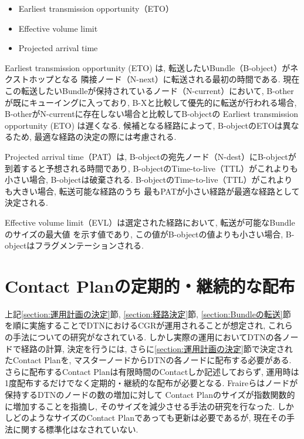 \begin{itemize}
    \item Earliest transmission opportunity（ETO）
    \item Effective volume limit
    \item Projected arrival time
\end{itemize}

Earliest transmission opportunity (ETO) は, 転送したいBundle（B-object）がネクストホップとなる
隣接ノード（N-next）に転送される最初の時間である.  
現在この転送したいBundleが保持されているノード（N-current）において, 
B-otherが既にキューイングに入っており, B-Xと比較して優先的に転送が行われる場合, 
B-otherがN-currentに存在しない場合と比較してB-objectの
Earliest transmission opportunity (ETO) は遅くなる.  
候補となる経路によって, B-objectのETOは異なるため, 最適な経路の決定の際には考慮される.  

Projected arrival time（PAT）は, B-objectの宛先ノード（N-dest）にB-objectが到着すると予想される時間であり, 
B-objectのTime-to-live（TTL）がこれよりも小さい場合, B-objectは破棄される.  
B-objectのTime-to-live（TTL）がこれよりも大きい場合, 転送可能な経路のうち
最もPATが小さい経路が最適な経路として決定される.  

Effective volume limit（EVL）は選定された経路において, 転送が可能なBundleのサイズの最大値
を示す値であり, この値がB-objectの値よりも小さい場合, B-objectはフラグメンテーションされる.  



\section{Contact Planの定期的・継続的な配布}
\label{section:Contact Planの定期的・継続的な配布}

上記\ref{section:運用計画の決定}節, \ref{section:経路決定}節, \ref{section:Bundleの転送}節
を順に実施することでDTNにおけるCGRが運用されることが想定され, 
これらの手法についての研究がなされている.  
しかし実際の運用においてDTNの各ノードで経路の計算, 決定を行うには, 
さらに\ref{section:運用計画の決定}節で決定されたContact Planを, 
マスターノードからDTNの各ノードに配布する必要がある.  
さらに配布するContact Planは有限時間のContactしか記述しておらず, 
運用時は1度配布するだけでなく定期的・継続的な配布が必要となる.  
Fraireらはノードが保持するDTNのノードの数の増加に対して
Contact Planのサイズが指数関数的に増加することを指摘し, 
そのサイズを減少させる手法の研究を行なった\cite{FRAIRE2018}.  
しかしどのようなサイズのContact Planであっても更新は必要であるが, 
現在その手法に関する標準化はなされていない.  

